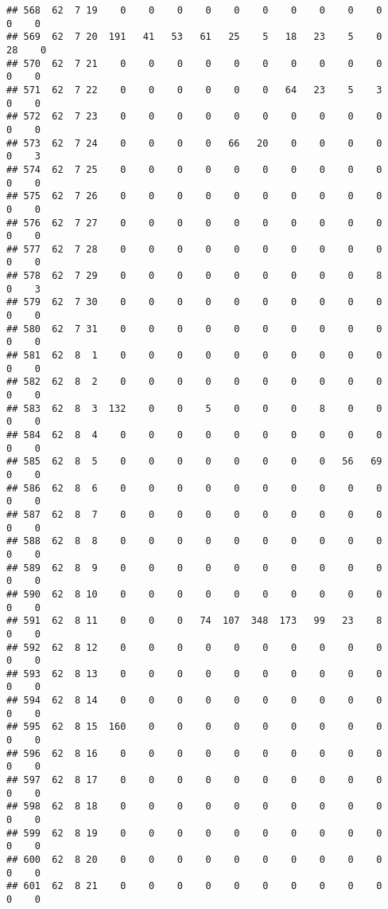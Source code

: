 \documentclass[]{article}
\begin{document}
\begin{verbatim}
## 568  62  7 19    0    0    0    0    0    0    0    0    0    0    0    0
## 569  62  7 20  191   41   53   61   25    5   18   23    5    0   28    0
## 570  62  7 21    0    0    0    0    0    0    0    0    0    0    0    0
## 571  62  7 22    0    0    0    0    0    0   64   23    5    3    0    0
## 572  62  7 23    0    0    0    0    0    0    0    0    0    0    0    0
## 573  62  7 24    0    0    0    0   66   20    0    0    0    0    0    3
## 574  62  7 25    0    0    0    0    0    0    0    0    0    0    0    0
## 575  62  7 26    0    0    0    0    0    0    0    0    0    0    0    0
## 576  62  7 27    0    0    0    0    0    0    0    0    0    0    0    0
## 577  62  7 28    0    0    0    0    0    0    0    0    0    0    0    0
## 578  62  7 29    0    0    0    0    0    0    0    0    0    8    0    3
## 579  62  7 30    0    0    0    0    0    0    0    0    0    0    0    0
## 580  62  7 31    0    0    0    0    0    0    0    0    0    0    0    0
## 581  62  8  1    0    0    0    0    0    0    0    0    0    0    0    0
## 582  62  8  2    0    0    0    0    0    0    0    0    0    0    0    0
## 583  62  8  3  132    0    0    5    0    0    0    8    0    0    0    0
## 584  62  8  4    0    0    0    0    0    0    0    0    0    0    0    0
## 585  62  8  5    0    0    0    0    0    0    0    0   56   69    0    0
## 586  62  8  6    0    0    0    0    0    0    0    0    0    0    0    0
## 587  62  8  7    0    0    0    0    0    0    0    0    0    0    0    0
## 588  62  8  8    0    0    0    0    0    0    0    0    0    0    0    0
## 589  62  8  9    0    0    0    0    0    0    0    0    0    0    0    0
## 590  62  8 10    0    0    0    0    0    0    0    0    0    0    0    0
## 591  62  8 11    0    0    0   74  107  348  173   99   23    8    0    0
## 592  62  8 12    0    0    0    0    0    0    0    0    0    0    0    0
## 593  62  8 13    0    0    0    0    0    0    0    0    0    0    0    0
## 594  62  8 14    0    0    0    0    0    0    0    0    0    0    0    0
## 595  62  8 15  160    0    0    0    0    0    0    0    0    0    0    0
## 596  62  8 16    0    0    0    0    0    0    0    0    0    0    0    0
## 597  62  8 17    0    0    0    0    0    0    0    0    0    0    0    0
## 598  62  8 18    0    0    0    0    0    0    0    0    0    0    0    0
## 599  62  8 19    0    0    0    0    0    0    0    0    0    0    0    0
## 600  62  8 20    0    0    0    0    0    0    0    0    0    0    0    0
## 601  62  8 21    0    0    0    0    0    0    0    0    0    0    0    0

\end{verbatim}
\end{document}
